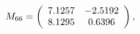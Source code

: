 \begin{equation}
M_{66}=
\left(
\begin{array}{c c}
7.1257&
-2.5192\\
8.1295&
0.6396\\
\end{array}
\right),
\end{equation}

